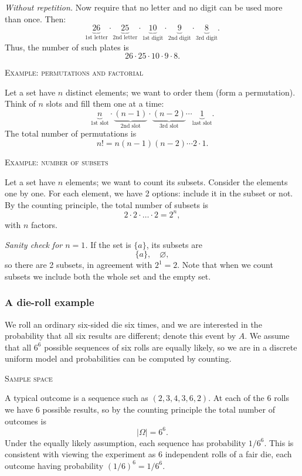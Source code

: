 \textit{Without repetition.}  
Now require that no letter and no digit can be used more than once.  
Then:
\[
\underbrace{26}_{\text{1st letter}}
\cdot
\underbrace{25}_{\text{2nd letter}}
\cdot
\underbrace{10}_{\text{1st digit}}
\cdot
\underbrace{9}_{\text{2nd digit}}
\cdot
\underbrace{8}_{\text{3rd digit}}.
\]
Thus, the number of such plates is
\[
26 \cdot 25 \cdot 10 \cdot 9 \cdot 8.
\]

\bigskip\textsc{Example: permutations and factorial}

Let a set have \(n\) distinct elements; we want to order them (form a permutation).  
Think of \(n\) slots and fill them one at a time:
\[
\underbrace{n}_{\text{1st slot}}
\cdot
\underbrace{(n-1)}_{\text{2nd slot}}
\cdot
\underbrace{(n-2)}_{\text{3rd slot}}
\cdots
\underbrace{1}_{\text{last slot}}.
\]
The total number of permutations is
\[
n! = n (n-1) (n-2) \cdots 2 \cdot 1.
\]

\bigskip\textsc{Example: number of subsets}

Let a set have \(n\) elements; we want to count its subsets.  
Consider the elements one by one. For each element, we have 2 options: include it in the subset or not.  
By the counting principle, the total number of subsets is
\[
2 \cdot 2 \cdot \dots \cdot 2 = 2^n,
\]
with \(n\) factors.

\textit{Sanity check for \(n = 1\).}  
If the set is \(\{a\}\), its subsets are
\[
\{a\}, \quad \varnothing,
\]
so there are 2 subsets, in agreement with \(2^1 = 2\).  
Note that when we count subsets we include both the whole set and the empty set.

\newpage
\subsubsection{A die-roll example}

We roll an ordinary six-sided die six times, and we are interested in the probability that all six results are different; denote this event by \(A\).  
We assume that all \(6^6\) possible sequences of six rolls are equally likely, so we are in a discrete uniform model and probabilities can be computed by counting.

\bigskip\textsc{Sample space}

A typical outcome is a sequence such as \((2,3,4,3,6,2)\).  
At each of the 6 rolls we have 6 possible results, so by the counting principle the total number of outcomes is
\[
|\Omega| = 6^6.
\]
Under the equally likely assumption, each sequence has probability \(1/6^6\).  
This is consistent with viewing the experiment as 6 independent rolls of a fair die, each outcome having probability \((1/6)^6 = 1/6^6\).

